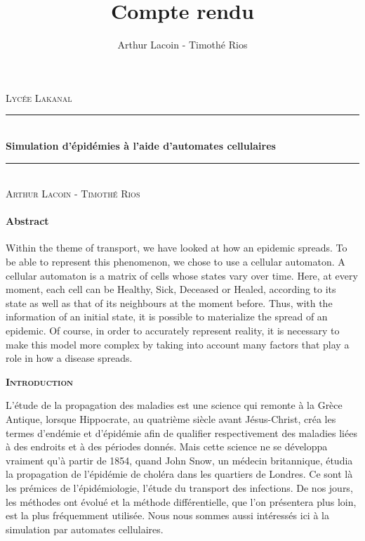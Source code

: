 \documentclass{article}
\title{Compte rendu}
\author{Arthur Lacoin - Timothé Rios}
\date{}
\newcommand{\HRule}{\rule{\linewidth}{0.5mm}}
\begin{document}
\begin{titlepage}
    \begin{sffamily}
    \begin{center}

        \textsc{\LARGE Lycée Lakanal}~\\[2cm]

        \HRule \\[0.4cm]
        { \huge \bfseries Simulation d'épidémies à l'aide d'automates cellulaires\\[0.4cm] }
        \HRule \\[2cm]
        \textsc{\Large Arthur Lacoin - Timothé Rios}\\[2cm]

    \end{center}
\end{sffamily}
\end{titlepage}

\tableofcontents

\newpage
\paragraph{Abstract\\}
	Within the theme of transport, we have looked at how an epidemic spreads. To be able to represent this phenomenon, we chose to use a cellular automaton. A cellular automaton is a matrix of cells whose states vary over time. Here, at every moment, each cell can be Healthy, Sick, Deceased or Healed, according to its state as well as that of its neighbours at the moment before. Thus, with the information of an initial state, it is possible to materialize the spread of an epidemic. Of course, in order to accurately represent reality, it is necessary to make this model more complex by taking into account many factors that play a role in how a disease spreads.\\[2cm]
	
\begin{center}
\LARGE
\bf
\textsc{Introduction}~\\[1cm]
\end{center}

	L'étude de la propagation des maladies est une science qui remonte à la Grèce Antique, lorsque Hippocrate, au quatrième siècle avant Jésus-Christ, créa les termes d'endémie et d'épidémie afin de qualifier respectivement des maladies liées à des endroits et à des périodes donnés. Mais cette science ne se développa vraiment qu'à partir de 1854, quand John Snow, un médecin britannique, étudia la propagation de l'épidémie de choléra dans les quartiers de Londres. Ce sont là les prémices de l'épidémiologie, l'étude du transport des infections. De nos jours, les méthodes ont évolué et la méthode différentielle, que l'on présentera plus loin, est la plus fréquemment utilisée. Nous nous sommes aussi intéressés ici à la simulation par automates cellulaires.
\end{document}
